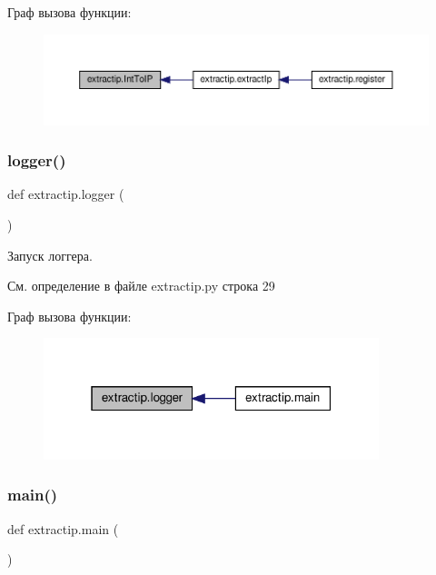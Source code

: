 Граф вызова функции\+:\nopagebreak
\begin{figure}[H]
\begin{center}
\leavevmode
\includegraphics[width=350pt]{namespaceextractip_a027ec0c1479a189825c3ddcfefa0622d_icgraph}
\end{center}
\end{figure}
\mbox{\label{namespaceextractip_ad06d305b46e8793c42d3b69a019b024a}} 
\subsubsection{\texorpdfstring{logger()}{logger()}}
{\footnotesize\ttfamily def extractip.\+logger (\begin{DoxyParamCaption}{ }\end{DoxyParamCaption})}



Запуск логгера. 



См. определение в файле extractip.\+py строка 29

Граф вызова функции\+:\nopagebreak
\begin{figure}[H]
\begin{center}
\leavevmode
\includegraphics[width=277pt]{namespaceextractip_ad06d305b46e8793c42d3b69a019b024a_icgraph}
\end{center}
\end{figure}
\mbox{\label{namespaceextractip_a4400b3ea86ebdf89264ad2424ca152e4}} 
\subsubsection{\texorpdfstring{main()}{main()}}
{\footnotesize\ttfamily def extractip.\+main (\begin{DoxyParamCaption}{ }\end{DoxyParamCaption})}



